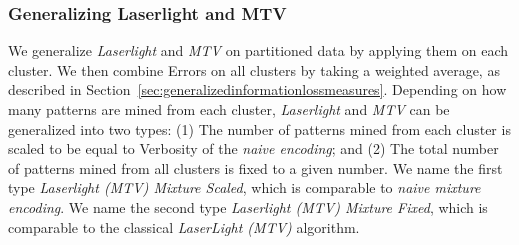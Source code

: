 \subsubsection{Generalizing Laserlight and MTV}
\label{sec:generalizinglaserlightandmtv}

We generalize \textit{Laserlight} and \textit{MTV} on partitioned data by applying them on each cluster.
We then combine Errors on all clusters by taking a weighted average, as described in Section~\ref{sec:generalizedinformationlossmeasures}.
Depending on how many patterns are mined from each cluster, \textit{Laserlight} and \textit{MTV} can be generalized into two types: (1) The number of patterns mined from each cluster is scaled to be equal to Verbosity of the \emph{naive encoding}; and (2) The total number of patterns mined from all clusters is fixed to a given number.
We name the first type \emph{Laserlight (MTV) Mixture Scaled}, which is comparable to \emph{naive mixture encoding}.
We name the second type \emph{Laserlight (MTV) Mixture Fixed}, which is comparable to the classical \emph{LaserLight (MTV)} algorithm.



